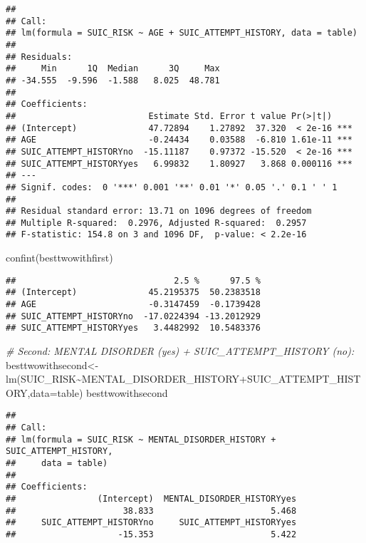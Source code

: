 \documentclass[
]{book}
\newenvironment{Shaded}{\begin{snugshade}}{\end{snugshade}}
\newcommand{\AttributeTok}[1]{\textcolor[rgb]{0.77,0.63,0.00}{#1}}
\newcommand{\CommentTok}[1]{\textcolor[rgb]{0.56,0.35,0.01}{\textit{#1}}}
\newcommand{\FunctionTok}[1]{\textcolor[rgb]{0.00,0.00,0.00}{#1}}
\newcommand{\NormalTok}[1]{#1}
\newcommand{\OtherTok}[1]{\textcolor[rgb]{0.56,0.35,0.01}{#1}}
\newcommand{\SpecialCharTok}[1]{\textcolor[rgb]{0.00,0.00,0.00}{#1}}
\begin{document}
\begin{verbatim}
## 
## Call:
## lm(formula = SUIC_RISK ~ AGE + SUIC_ATTEMPT_HISTORY, data = table)
## 
## Residuals:
##     Min      1Q  Median      3Q     Max 
## -34.555  -9.596  -1.588   8.025  48.781 
## 
## Coefficients:
##                          Estimate Std. Error t value Pr(>|t|)    
## (Intercept)              47.72894    1.27892  37.320  < 2e-16 ***
## AGE                      -0.24434    0.03588  -6.810 1.61e-11 ***
## SUIC_ATTEMPT_HISTORYno  -15.11187    0.97372 -15.520  < 2e-16 ***
## SUIC_ATTEMPT_HISTORYyes   6.99832    1.80927   3.868 0.000116 ***
## ---
## Signif. codes:  0 '***' 0.001 '**' 0.01 '*' 0.05 '.' 0.1 ' ' 1
## 
## Residual standard error: 13.71 on 1096 degrees of freedom
## Multiple R-squared:  0.2976, Adjusted R-squared:  0.2957 
## F-statistic: 154.8 on 3 and 1096 DF,  p-value: < 2.2e-16
\end{verbatim}

\begin{Shaded}
\begin{Highlighting}[]
\FunctionTok{confint}\NormalTok{(besttwowithfirst)}
\end{Highlighting}
\end{Shaded}

\begin{verbatim}
##                               2.5 %      97.5 %
## (Intercept)              45.2195375  50.2383518
## AGE                      -0.3147459  -0.1739428
## SUIC_ATTEMPT_HISTORYno  -17.0224394 -13.2012929
## SUIC_ATTEMPT_HISTORYyes   3.4482992  10.5483376
\end{verbatim}

\begin{Shaded}
\begin{Highlighting}[]
\CommentTok{\# Second: MENTAL DISORDER (yes) + SUIC\_ATTEMPT\_HISTORY (no):}
\NormalTok{besttwowithsecond}\OtherTok{\textless{}{-}}\FunctionTok{lm}\NormalTok{(SUIC\_RISK}\SpecialCharTok{\textasciitilde{}}\NormalTok{MENTAL\_DISORDER\_HISTORY}\SpecialCharTok{+}\NormalTok{SUIC\_ATTEMPT\_HISTORY,}\AttributeTok{data=}\NormalTok{table)}
\NormalTok{besttwowithsecond}
\end{Highlighting}
\end{Shaded}

\begin{verbatim}
## 
## Call:
## lm(formula = SUIC_RISK ~ MENTAL_DISORDER_HISTORY + SUIC_ATTEMPT_HISTORY, 
##     data = table)
## 
## Coefficients:
##                (Intercept)  MENTAL_DISORDER_HISTORYyes  
##                     38.833                       5.468  
##     SUIC_ATTEMPT_HISTORYno     SUIC_ATTEMPT_HISTORYyes  
##                    -15.353                       5.422
\end{verbatim}
\end{document}
